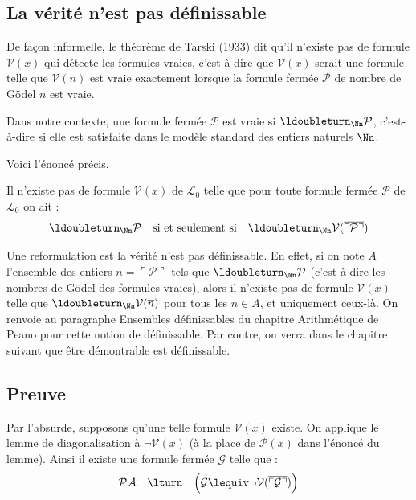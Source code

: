 \documentclass[11pt,class=report,crop=false]{standalone}
\begin{document}
\subsection{La vérité n'est pas définissable}

De façon informelle, le théorème de Tarski (1933) dit qu'il n'existe pas de formule $\mathcal{V}(x)$ qui détecte les formules vraies, c'est-à-dire que $\mathcal{V}(x)$ serait une formule telle que $\mathcal{V}(\overline{n})$ est vraie exactement lorsque la formule fermée $\mathcal{P}$ de nombre de Gödel $n$ est vraie.
    
Dans notre contexte, une formule fermée $\mathcal{P}$ est vraie si $\ldoubleturn_{\Nn} \mathcal{P}$, c'est-à-dire si elle est satisfaite dans le modèle standard des entiers naturels $\Nn$.
    
Voici l'énoncé précis.
\begin{theoreme}[Tarski]
    \label{th:tarski}
    Il n'existe pas de formule $\mathcal{V}(x)$ de $\mathcal{L}_0$ telle que pour toute formule fermée $\mathcal{P}$ de $\mathcal{L}_0$ on ait :
    \[ \ldoubleturn_{\Nn} \mathcal{P} \quad \text{si et seulement si} \quad \ldoubleturn_{\Nn} \mathcal{V}(\overline{\ulcorner \mathcal{P} \urcorner}) \]
\end{theoreme}

Une reformulation est \og{}la vérité n'est pas définissable\fg{}. En effet, si on note $A$ l'ensemble des entiers $n = \ulcorner \mathcal{P} \urcorner$ tels que $\ldoubleturn_{\Nn} \mathcal{P}$ (c'est-à-dire les nombres de Gödel des formules vraies), alors il n'existe pas de formule $\mathcal{V}(x)$ telle que $\ldoubleturn_{\Nn} \mathcal{V}(\overline{n})$ pour tous les $n \in A$, et uniquement ceux-là.
On renvoie au paragraphe \og{}Ensembles définissables\fg{} du chapitre \og{}Arithmétique de Peano\fg{} pour cette notion de \og{}définissable\fg{}.
Par contre, on verra dans le chapitre suivant que \og{}être démontrable\fg{} est définissable.

\subsection{Preuve}

Par l'absurde, supposons qu'une telle formule $\mathcal{V}(x)$ existe.
    On applique le lemme de diagonalisation à $\lnot \mathcal{V}(x)$ (à la place de $\mathcal{P}(x)$ dans l'énoncé du lemme).
    Ainsi il existe une formule fermée $\mathcal{G}$ telle que :
    \[ \mathcal{PA} \quad \lturn \quad \Big( \mathcal{G} \lequiv \lnot \mathcal{V}(\overline{\ulcorner \mathcal{G} \urcorner}) \Big) \]
    
\end{document}
